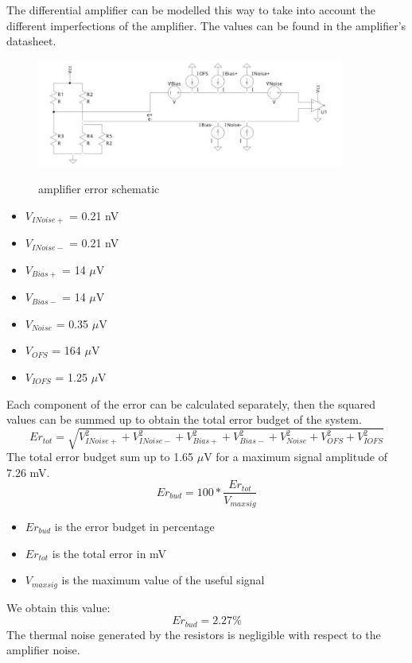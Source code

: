 \documentclass{article}[12pt]
\begin{document}
The differential amplifier can be modelled this way to take into account the different imperfections of the amplifier.
The values can be found in the amplifier's datasheet.
\begin{figure}[H]
    \centering
    \includegraphics[width=0.9\textwidth]{figures/error_budget.pdf}
    \label{fig:error_budget}
    \caption{amplifier error schematic}
\end{figure}
\begin{itemize}
    \item $V_{INoise+}$ = 0.21 nV
    \item $V_{INoise-}$ = 0.21 nV
    \item $V_{Bias+}$ = 14 $\mu$V
    \item $V_{Bias-}$ = 14 $\mu$V
    \item $V_{Noise}$ = 0.35 $\mu$V
    \item $V_{OFS}$ = 164 $\mu$V
    \item $V_{IOFS}$ = 1.25 $\mu$V
\end{itemize}
Each component of the error can be calculated separately, then the squared values can be summed up to obtain the total error budget of the system.
\begin{equation}
    Er_{tot}=\sqrt{V_{INoise+}^2 + V_{INoise-}^2 + V_{Bias+}^2 + V_{Bias-}^2 + V_{Noise}^2 + V_{OFS}^2 + V_{IOFS}^2}
\end{equation}
The total error budget sum up to 1.65 $\mu$V for a maximum signal amplitude of 7.26 mV.
\begin{equation}
    Er_{bud}=100*\dfrac{Er_{tot}}{V_{maxsig}}
\end{equation}
\begin{itemize}
    \item $Er_{bud}$ is the error budget in percentage
    \item $Er_{tot}$ is the total error in mV
    \item $V_{maxsig}$ is the maximum value of the useful signal
\end{itemize}
We obtain this value:
\begin{equation}
    Er_{bud}=2.27\%
\end{equation}
The thermal noise generated by the resistors is negligible with respect to the amplifier noise.
\end{document}
